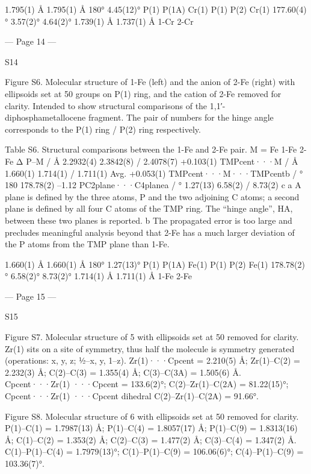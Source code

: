  
1.795(1) Å
1.795(1) Å
180°
4.45(12)°
P(1)
P(1A)
Cr(1)
P(1)
P(2)
Cr(1)
177.60(4)°
3.57(2)° 
4.64(2)°
1.739(1) Å
1.737(1) Å
1-Cr
2-Cr


--- Page 14 ---
 
 
S14 
 
 
 
Figure S6. Molecular structure of 1-Fe (left) and the anion of 2-Fe (right) with ellipsoids set at 50%
groups on P(1) ring, and the cation of 2-Fe removed for clarity. Intended to show structural comparisons of the 1,1′-
diphosphametallocene fragment. The pair of numbers for the hinge angle corresponds to the P(1) ring / P(2) ring respectively. 
 
Table S6. Structural comparisons between the 1-Fe and 2-Fe pair. 
M = Fe 
1-Fe 
2-Fe 
Δ 
P–M / Å 
2.2932(4) 
2.3842(8) / 2.4078(7) 
+0.103(1) 
TMPcent···M / Å 
1.660(1) 
1.714(1) / 1.711(1) 
Avg. +0.053(1) 
TMPcent···M···TMPcentb / ° 
180 
178.78(2) 
–1.12 
PC2plane···C4planea / ° 
1.27(13) 
6.58(2) / 8.73(2) 
c 
a A plane is defined by the three atoms, P and the two adjoining C atoms; a second plane is defined by all four C atoms of the 
TMP ring. The “hinge angle”, HA, between these two planes is reported. 
b The propagated error is too large and precludes meaningful analysis beyond that 2-Fe has a much larger deviation of the P 
atoms from the TMP plane than 1-Fe. 
 
 
1.660(1) Å
1.660(1) Å
180°
1.27(13)°
P(1)
P(1A)
Fe(1)
P(1)
P(2)
Fe(1)
178.78(2)°
6.58(2)° 
8.73(2)°
1.714(1) Å
1.711(1) Å
1-Fe
2-Fe


--- Page 15 ---
 
 
S15 
 
 
 
Figure S7. Molecular structure of 5 with ellipsoids set at 50%
removed for clarity. Zr(1) sits on a site of symmetry, thus half the molecule is symmetry generated (operations: x, y, z; ½–x, 
y, 1–z). 
Zr(1)···Cpcent = 2.210(5) Å; Zr(1)–C(2) = 2.232(3) Å; C(2)–C(3) = 1.355(4) Å; C(3)–C(3A) = 1.505(6) Å. 
Cpcent···Zr(1) ···Cpcent = 133.6(2)°; C(2)–Zr(1)–C(2A) = 81.22(15)°; Cpcent···Zr(1) ···Cpcent dihedral C(2)–Zr(1)–C(2A) = 
91.66°. 
 
 
Figure S8. Molecular structure of 6 with ellipsoids set at 50%
removed for clarity. 
P(1)–C(1) = 1.7987(13) Å; P(1)–C(4) = 1.8057(17) Å; P(1)–C(9) = 1.8313(16) Å; C(1)–C(2) = 1.353(2) Å; C(2)–C(3) = 
1.477(2) Å; C(3)–C(4) = 1.347(2) Å. 
C(1)–P(1)–C(4) = 1.7979(13)°; C(1)–P(1)–C(9) = 106.06(6)°; C(4)–P(1)–C(9) = 103.36(7)°. 
 

